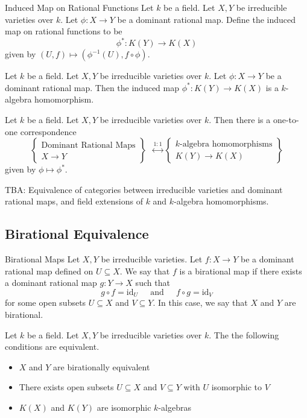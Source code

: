 \documentclass[a4paper]{article}
\begin{document}
\begin{defn}{Induced Map on Rational Functions}{} Let $k$ be a field. Let $X,Y$ be irreducible varieties over $k$. Let $\phi:X\to Y$ be a dominant rational map. Define the induced map on rational functions to be $$\phi^\ast:K(Y)\to K(X)$$ given by $(U,f)\mapsto (\phi^{-1}(U),f\circ\phi)$. 
\end{defn}

\begin{prp}{}{} Let $k$ be a field. Let $X,Y$ be irreducible varieties over $k$. Let $\phi:X\to Y$ be a dominant rational map. Then the induced map $\phi^\ast:K(Y)\to K(X)$ is a $k$-algebra homomorphism. 
\end{prp}

\begin{prp}{}{} Let $k$ be a field. Let $X,Y$ be irreducible varieties over $k$. Then there is a one-to-one correspondence $$\left\{\substack{\text{Dominant Rational Maps}\\X\to Y}\right\}\;\;\overset{1:1}{\longleftrightarrow}\left\{\substack{k\text{-algebra homomorphisms}\\K(Y)\to K(X)}\right\}$$ given by $\phi\mapsto\phi^\ast$. 
\end{prp}

TBA: Equivalence of categories between irreducible varieties and dominant rational maps, and field extensions of $k$ and $k$-algebra homomorphisms. 

\subsection{Birational Equivalence}
\begin{defn}{Birational Maps}{} Let $X,Y$ be irreducible varieties. Let $f:X\to Y$ be a dominant rational map defined on $U\subseteq X$. We say that $f$ is a birational map if there exists a dominant rational map $g:Y\to X$ such that $$g\circ f=\text{id}_U\;\;\;\;\text{ and }\;\;\;\;f\circ g=\text{id}_V$$ for some open subsets $U\subseteq X$ and $V\subseteq Y$. In this case, we say that $X$ and $Y$ are birational. 
\end{defn}

\begin{prp}{}{} Let $k$ be a field. Let $X,Y$ be irreducible varieties over $k$. The the following conditions are equivalent. 
\begin{itemize}
\item $X$ and $Y$ are birationally equivalent
\item There exists open subsets $U\subseteq X$ and $V\subseteq Y$ with $U$ isomorphic to $V$
\item $K(X)$ and $K(Y)$ are isomorphic $k$-algebras
\end{itemize}
\end{prp}
\end{document}
